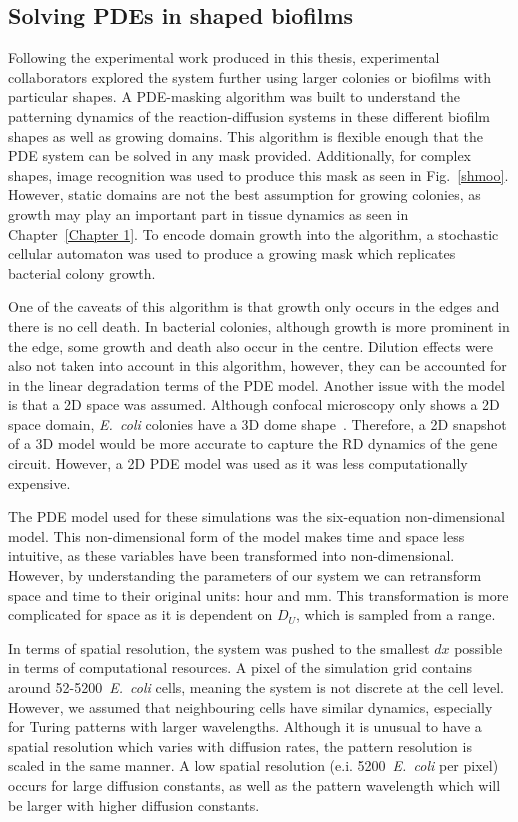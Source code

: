 \subsection{Solving PDEs in shaped biofilms}
Following the experimental work produced in this thesis, experimental collaborators explored the system further using larger colonies or biofilms with particular shapes.
A PDE-masking algorithm was built to understand the patterning dynamics of the reaction-diffusion systems in these different biofilm shapes as well as growing domains.
This algorithm is flexible enough that the PDE system can be solved in any mask provided.
Additionally, for complex shapes, image recognition was used to produce this mask as seen in Fig.~\ref{shmoo}.
However, static domains are not the best assumption for growing colonies, as growth may play an important part in tissue dynamics as seen in Chapter~\ref{Chapter 1}.
To encode domain growth into the algorithm, a stochastic cellular automaton was used to produce a growing mask which replicates bacterial colony growth.

One of the caveats of this algorithm is that growth only occurs in the edges and there is no cell death.
In bacterial colonies, although growth is more prominent in the edge, some growth and death also occur in the centre.
Dilution effects were also not taken into account in this algorithm, however, they can be accounted for in the linear degradation terms of the PDE model.
Another issue with the model is that a 2D space was assumed.
Although confocal microscopy only shows a 2D space domain, \textit{E.~coli} colonies have a 3D dome shape~\parencite{wimpenny1979growth}.
Therefore, a 2D snapshot of a 3D model would be more accurate to capture the RD dynamics of the gene circuit.
However, a 2D PDE model was used as it was less computationally expensive.

The PDE model used for these simulations was the six-equation non-dimensional model.
This non-dimensional form of the model makes time and space less intuitive, as these variables have been transformed into non-dimensional.
However, by understanding the parameters of our system we can retransform space and time to their original units: hour and mm.
This transformation is more complicated for space as it is dependent on $D_{U}$, which is sampled from a range.

In terms of spatial resolution, the system was pushed to the smallest $dx$ possible in terms of computational resources.
A pixel of the simulation grid contains around 52-5200~\textit{E.~coli} cells, meaning the system is not discrete at the cell level.
However, we assumed that neighbouring cells have similar dynamics, especially for Turing patterns with larger wavelengths.
Although it is unusual to have a spatial resolution which varies with diffusion rates, the pattern resolution is scaled in the same manner.
A low spatial resolution (e.i. 5200~\textit{E.~coli} per pixel) occurs for large diffusion constants, as well as the pattern wavelength which will be larger with higher diffusion constants.

